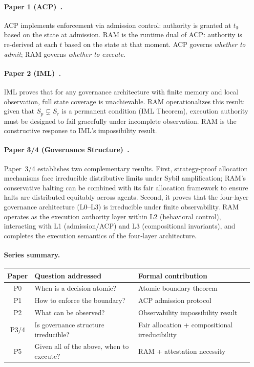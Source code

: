 \documentclass[11pt]{article}
\newcommand{\Sr}{S_r}
\newcommand{\Sp}{S_p}
\begin{document}
\paragraph{Paper 1 (ACP)~\cite{fernandez2026b}.}
ACP implements enforcement via admission control: authority is granted at
$t_0$ based on the state at admission.
RAM is the runtime dual of ACP: authority is re-derived at each $t$ based
on the state at that moment.
ACP governs \emph{whether to admit}; RAM governs \emph{whether to execute}.

\paragraph{Paper 2 (IML)~\cite{fernandez2026c}.}
IML proves that for any governance architecture with finite memory and local
observation, full state coverage is unachievable.
RAM operationalizes this result: given that $\Sp \subsetneq \Sr$ is a
permanent condition (IML Theorem), execution authority must be designed to
fail gracefully under incomplete observation.
RAM is the constructive response to IML's impossibility result.

\paragraph{Paper 3/4 (Governance Structure)~\cite{fernandez2026govstr}.}
Paper~3/4 establishes two complementary results. First, strategy-proof allocation
mechanisms face irreducible distributive limits under Sybil amplification; RAM's
conservative halting can be combined with its fair allocation framework to ensure
halts are distributed equitably across agents. Second, it proves that the
four-layer governance architecture (L0--L3) is irreducible under finite
observability. RAM operates as the execution authority layer within L2 (behavioral
control), interacting with L1 (admission/ACP) and L3 (compositional invariants),
and completes the execution semantics of the four-layer architecture.

\paragraph{Series summary.}
\begin{center}
\small
\begin{tabular}{cll}
\toprule
\textbf{Paper} & \textbf{Question addressed} & \textbf{Formal contribution} \\
\midrule
P0 & When is a decision atomic? & Atomic boundary theorem \\
P1 & How to enforce the boundary? & ACP admission protocol \\
P2 & What can be observed? & Observability impossibility result \\
P3/4 & Is governance structure irreducible? & Fair allocation + compositional irreducibility \\
P5 & Given all of the above, when to execute? & RAM + attestation necessity \\
\bottomrule
\end{tabular}
\end{center}
\end{document}
